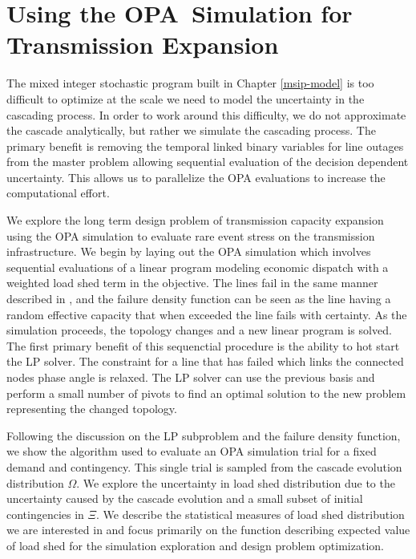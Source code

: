 \chapter{Using the OPA~Simulation for Transmission Expansion}\label{dfo-chapter}

The mixed integer stochastic program built in Chapter \ref{msip-model} is too difficult to optimize at the scale we need to model the uncertainty in the cascading process.  In order to work around this difficulty, we do not approximate the cascade analytically, but rather we simulate the cascading process.  The primary benefit is removing the temporal linked binary variables for line outages from the master problem allowing sequential evaluation of the decision dependent uncertainty.  This allows us to parallelize the OPA evaluations to increase the computational effort.

We explore the long term design problem of transmission capacity expansion using the OPA simulation to evaluate rare event stress on the transmission infrastructure.  We begin by laying out the OPA simulation which involves sequential evaluations of a linear program modeling economic dispatch with a weighted load shed term in the objective.  The lines fail in the same manner described in , and the failure density function can be seen as the line having a random effective capacity that when exceeded the line fails with certainty.  As the simulation proceeds, the topology changes and a new linear program is solved.  The first primary benefit of this sequenctial procedure is the ability to hot start the LP solver.  The constraint for a line that has failed which links the connected nodes phase angle is relaxed.  The LP solver can use the previous basis and perform a small number of pivots to find an optimal solution to the new problem representing the changed topology.

Following the discussion on the LP subproblem and the failure density function, we show the algorithm used to evaluate an OPA simulation trial for a fixed demand and contingency.  This single trial is sampled from the cascade evolution distribution $\Omega$.  We explore the uncertainty in load shed distribution due to the uncertainty caused by the cascade evolution and a small subset of initial contingencies in $\Xi$. We describe the statistical measures of load shed distribution we are interested in  and focus primarily on the function describing expected value of load shed for the simulation exploration and design problem optimization.


